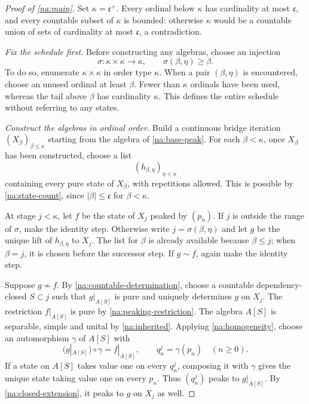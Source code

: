 \begin{proof}[Proof of \cref{na:main}]
Set $\kappa=\mathfrak c^+$. Every ordinal below $\kappa$ has
cardinality at most $\mathfrak c$, and every countable subset of
$\kappa$ is bounded: otherwise $\kappa$ would be a countable union
of sets of cardinality at most $\mathfrak c$, a contradiction.

\smallskip\noindent
\emph{Fix the schedule first.}
Before constructing any algebras, choose an injection
\begin{equation}\label{eq:schedule}
 \sigma:\kappa\times\kappa\longrightarrow\kappa,
 \qquad \sigma(\beta,\eta)\ge\beta.
\end{equation}
To do so, enumerate $\kappa\times\kappa$ in order type $\kappa$.
When a pair $(\beta,\eta)$ is encountered, choose an unused ordinal
at least $\beta$. Fewer than $\kappa$ ordinals have been used,
whereas the tail above $\beta$ has cardinality $\kappa$.
This defines the entire schedule without referring to any states.

\smallskip\noindent
\emph{Construct the algebras in ordinal order.}
Build a continuous bridge iteration $(X_\beta)_{\beta\le\kappa}$
starting from the algebra of \cref{na:base-peak}. For each
$\beta<\kappa$, once $X_\beta$ has been constructed, choose a list
\[
 (h_{\beta,\eta})_{\eta<\kappa}
\]
containing every pure state of $X_\beta$, with repetitions allowed.
This is possible by \cref{na:state-count}, since
$|\beta|\le\mathfrak c$ for $\beta<\kappa$.

At stage $j<\kappa$, let $f$ be the state of $X_j$ peaked by
$(p_n)$. If $j$ is outside the range of $\sigma$, make the identity
step. Otherwise write $j=\sigma(\beta,\eta)$ and let $g$ be the
unique lift of $h_{\beta,\eta}$ to $X_j$. The list for $\beta$ is
already available because $\beta\le j$; when $\beta=j$, it is
chosen before the successor step. If $g\sim f$, again make the
identity step.

Suppose $g\not\sim f$. By \cref{na:countable-determination}, choose
a countable dependency-closed $S\subset j$ such that $g|_{A[S]}$
is pure and uniquely determines $g$ on $X_j$. The restriction
$f|_{A[S]}$ is pure by \cref{na:peaking-restriction}. The algebra
$A[S]$ is separable, simple and unital by \cref{na:inherited}.
Applying \cref{na:homogeneity}, choose an automorphism $\gamma$
of $A[S]$ with
\[
 (g|_{A[S]})\circ\gamma=f|_{A[S]},
 \qquad q_n^j=\gamma(p_n)\quad(n\ge0).
\]
If a state on $A[S]$ takes value one on every $q_n^j$, composing
it with $\gamma$ gives the unique state taking value one on every
$p_n$. Thus $(q_n^j)$ peaks to $g|_{A[S]}$. By
\cref{na:closed-extension}, it peaks to $g$ on $X_j$ as well.


\end{proof}
